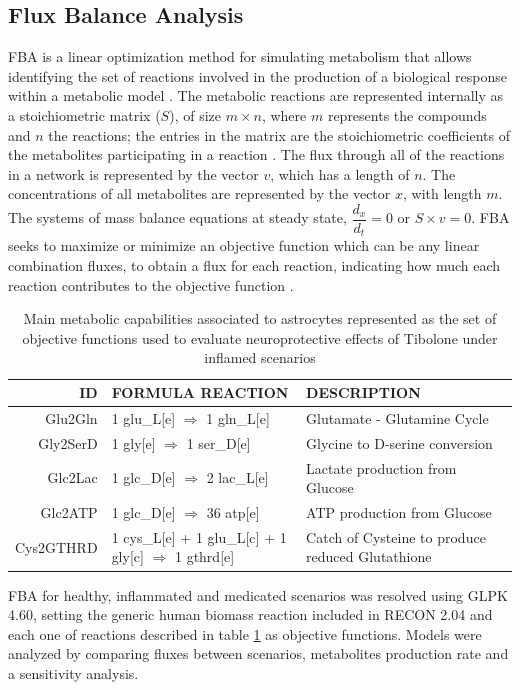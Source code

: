 \subsection*{Flux Balance Analysis}
FBA is a linear optimization method for simulating metabolism that allows identifying the set of reactions involved in the production of a biological response within a metabolic model \cite{Orth2010}. The metabolic reactions are represented internally as a stoichiometric matrix ($S$), of size $m \times n$, where $m$ represents the compounds and $n$ the reactions; the entries in the matrix are the stoichiometric coefficients of the metabolites participating in a reaction \cite{Raman2009}. The flux through all of the reactions in a network is represented by the vector $v$, which has a length of $n$. The concentrations of all metabolites are represented by the vector $x$, with length $m$. The systems of mass balance equations at steady state, $\dfrac{d_{x}}{d_{t}}=0$ or $S \times v = 0$. FBA seeks to maximize or minimize an objective function which can be any linear combination fluxes, to obtain a flux for each reaction, indicating how much each reaction contributes to the objective function \cite{Orth2010}.

\begin{table}[h]
\caption{Main metabolic capabilities associated to astrocytes represented as the set of objective functions used to evaluate neuroprotective effects of Tibolone under inflamed scenarios}
\label{OF}
\begin{center}
\begin{tabular}{rm{6.5cm}m{6cm}}
\hline
ID & FORMULA REACTION & DESCRIPTION \\
\hline
\hline
Glu2Gln & 1 glu\_L[e] $\Rightarrow$ 1 gln\_L[e] & Glutamate - Glutamine Cycle \\
Gly2SerD & 1 gly[e] $\Rightarrow$ 1 ser\_D[e] & Glycine to D-serine conversion\\
Glc2Lac & 1 glc\_D[e] $\Rightarrow$ 2 lac\_L[e]& Lactate production from Glucose \\
Glc2ATP & 1 glc\_D[e] $\Rightarrow$ 36 atp[e] & ATP production from Glucose \\
Cys2GTHRD&1 cys\_L[e] + 1 glu\_L[c] + 1 gly[c] $\Rightarrow$ 1 gthrd[e]& Catch of Cysteine to produce reduced Glutathione \\
\hline
\end{tabular}
\end{center}
\end{table} 

FBA for healthy, inflammated and medicated scenarios was resolved using GLPK 4.60, setting the generic human biomass reaction included in RECON 2.04 and each one of reactions described in table \ref{OF} as objective functions. Models were analyzed by comparing fluxes between scenarios, metabolites production rate and a sensitivity analysis.

